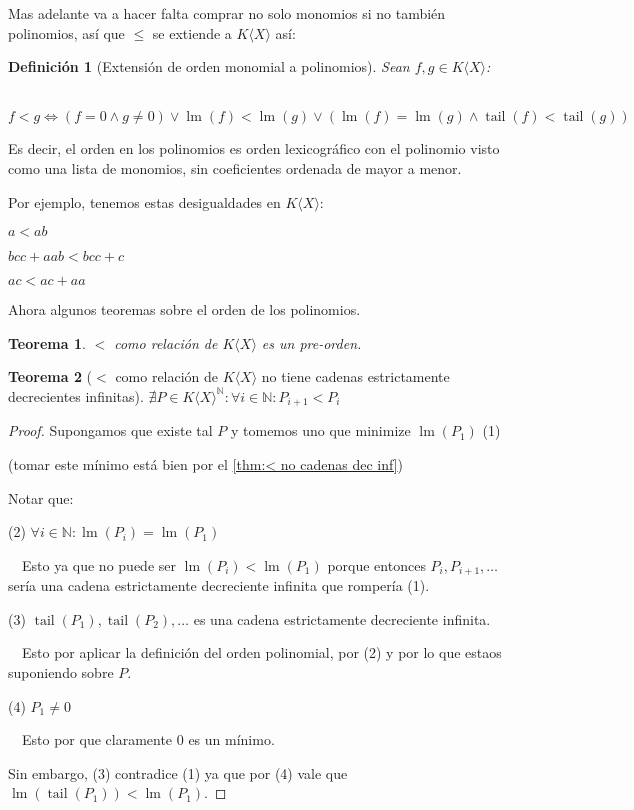 \documentclass{amsbook}
\theoremstyle{customstyle}
\newtheorem{definition}{Definición}[section]
\newtheorem{theorem}{Teorema}[section]
\DeclareMathOperator{\lm}{lm}
\DeclareMathOperator{\tail}{tail}
\begin{document}
Mas adelante va a hacer falta comprar no solo monomios si no también polinomios, así que $≤$ se extiende a $K⟨X⟩$ así:

\begin{definition}[Extensión de orden monomial a polinomios]
Sean $f, g ∈  K⟨X⟩$:

  $f < g ⇔ (f = 0 ∧ g ≠ 0) ∨ \lm(f) < \lm(g) ∨ (\lm(f) = \lm(g) ∧ \tail(f) < \tail(g))$

\end{definition}
Es decir, el orden en los polinomios es orden lexicográfico con el polinomio visto como una lista de monomios, sin coeficientes ordenada de mayor a menor.

Por ejemplo, tenemos estas desigualdades en $K⟨X⟩$:

$a < ab$

$bcc + aab < bcc + c$

$ac < ac + aa$

Ahora algunos teoremas sobre el orden de los polinomios.

\begin{theorem}
$<$ como relación de $K⟨X⟩$ es un pre-orden.
\end{theorem}

\begin{theorem}[$<$ como relación de $K⟨X⟩$ no tiene cadenas estrictamente decrecientes infinitas]\label{thm:< en KX no cadenas dec inf}
  $∄P ∈ K⟨X⟩^ℕ : ∀i ∈ ℕ : P_{i + 1} < P_i$
\end{theorem}
\begin{proof}
Supongamos que existe tal $P$ y tomemos uno que minimize $\lm(P_1)$ (1)

(tomar este mínimo está bien por el \cref{thm:< no cadenas dec inf})

Notar que:

(2) $∀i ∈ ℕ : \lm(P_i) = \lm(P_1)$

  Esto ya que no puede ser $\lm(P_i) < \lm(P_1)$ porque entonces $P_i, P_{i + 1}, …$ sería una cadena estrictamente decreciente infinita que rompería (1).


(3) $\tail(P_1), \tail(P_2), …$ es una cadena estrictamente decreciente infinita.

  Esto por aplicar la definición del orden polinomial, por (2) y por lo que estaos suponiendo sobre $P$.

(4) $P_1 ≠ 0$

  Esto por que claramente $0$ es un mínimo.

Sin embargo, (3) contradice (1) ya que por (4) vale que $\lm(\tail(P_1)) < \lm(P_1)$.

\end{proof}
\end{document}
